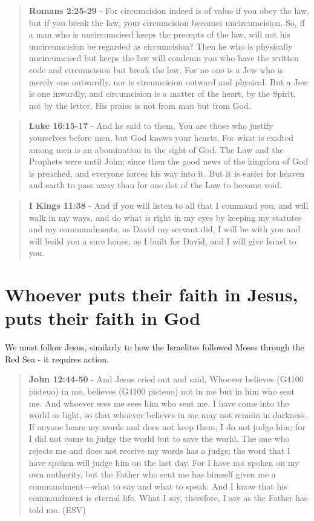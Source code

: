 \documentclass[11pt]{article}
\begin{document}
\begin{quote}
\textbf{Romans 2:25-29} - For circumcision indeed is of value if you obey the law, but if you break the law, your circumcision becomes uncircumcision. So, if a man who is uncircumcised keeps the precepts of the law, will not his uncircumcision be regarded as circumcision? Then he who is physically uncircumcised but keeps the law will condemn you who have the written code and circumcision but break the law. For no one is a Jew who is merely one outwardly, nor is circumcision outward and physical. But a Jew is one inwardly, and circumcision is a matter of the heart, by the Spirit, not by the letter. His praise is not from man but from God.
\end{quote}

\begin{quote}
\textbf{Luke 16:15-17} - And he said to them, You are those who justify yourselves before men, but God knows your hearts. For what is exalted among men is an abomination in the sight of God.  The Law and the Prophets were until John; since then the good news of the kingdom of God is preached, and everyone forces his way into it.  But it is easier for heaven and earth to pass away than for one dot of the Law to become void.
\end{quote}

\begin{quote}
\textbf{I Kings 11:38} - And if you will listen to all that I command you, and will walk in my ways, and do what is right in my eyes by keeping my statutes and my commandments, as David my servant did, I will be with you and will build you a sure house, as I built for David, and I will give Israel to you.
\end{quote}

\section{Whoever puts their faith in Jesus, puts their faith in God}
\label{sec:org915f221}
We must follow Jesus, similarly to how the Israelites followed Moses through the Red Sea - it requires action.

\begin{quote}
\textbf{John 12:44-50} - And Jesus cried out and said, Whoever believes (G4100 pisteuo) in me, believes (G4100 pisteuo) not in me but in him who sent me.  And whoever sees me sees him who sent me.  I have come into the world as light, so that whoever believes in me may not remain in darkness.  If anyone hears my words and does not keep them, I do not judge him; for I did not come to judge the world but to save the world.  The one who rejects me and does not receive my words has a judge; the word that I have spoken will judge him on the last day.  For I have not spoken on my own authority, but the Father who sent me has himself given me a commandment—what to say and what to speak.  And I know that his commandment is eternal life.  What I say, therefore, I say as the Father has told me. (ESV)
\end{quote}
\end{document}
